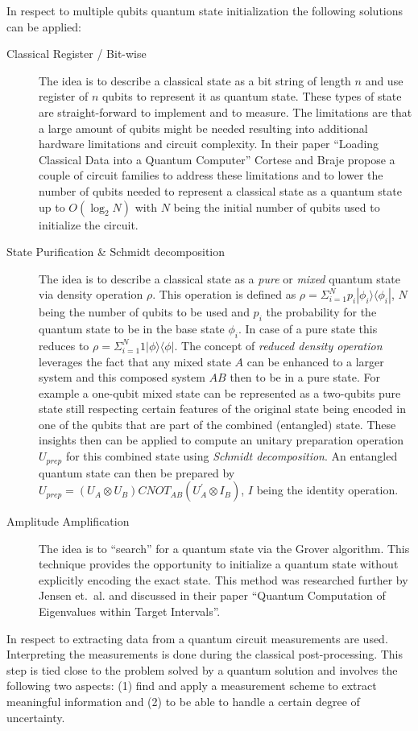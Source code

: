 In respect to multiple qubits quantum state initialization the following solutions can be applied:
\begin{description}
  \item [Classical Register / Bit-wise] The idea is to describe a classical state as a bit string of length $n$ and use register of $n$ qubits to
represent it as quantum state. These types of state are straight-forward to implement and to measure. The limitations are that a large amount of qubits might be needed resulting into additional hardware limitations and circuit complexity. In their paper \enquote{Loading Classical Data into a Quantum Computer} \cite{Corte_2018} Cortese and Braje propose a couple of circuit families to address these limitations and to lower the number of qubits needed to represent a classical state as a quantum state up to $O(\log_2{N})$ with $N$ being the initial number of qubits used to initialize the circuit.
  \item [State Purification \& Schmidt decomposition] The idea is to describe a classical state as a \emph{pure} or \emph{mixed} quantum state via density operation $\rho$. This operation is defined as $\rho = \Sigma_{i=1}^N p_i| \phi_i \rangle \langle \phi_i |$, $N$ being the number of qubits to be used and $p_i$ the probability for the quantum state to be in the base state $\phi_i$. In case of a pure state this reduces to $\rho = \Sigma_{i=1}^N 1| \phi \rangle \langle \phi |$. The concept of \emph{reduced density operation} leverages the fact that any mixed state $A$ can be enhanced to a larger system and this composed system $AB$ then to be in a pure state.\cite{Niels_2010}\cite{Lokho_2020}\cite{Qtb_Densit} For example a one-qubit mixed state can be represented as a two-qubits pure state still respecting certain features of the original state being encoded in one of the qubits that are part of the combined (entangled) state. These insights then can be applied to compute an unitary preparation operation $U_{prep}$ for this combined state using \emph{Schmidt decomposition}.\cite{Niels_2010} An entangled quantum state can then be prepared by $U_{prep} = (U_A \otimes U_B) CNOT_{AB} (U_A^{'} \otimes I_B)$, $I$ being the identity operation.\cite{Lokho_2020}
  \item [Amplitude Amplification] The idea is to \enquote{search} for a quantum state via the Grover algorithm. This technique provides the opportunity to initialize a quantum state without explicitly encoding the exact state.\cite{Daski_2015}\cite{Qtb_Grover} This method was researched further by Jensen et.~al. and discussed in their paper \enquote{Quantum Computation of Eigenvalues within Target Intervals}.\cite{Jense_2020}
\end{description}

In respect to extracting data from a quantum circuit measurements are used. Interpreting the measurements is done during the classical post-processing. This step is tied close to the problem solved by a quantum solution and involves the following two aspects: (1) find and apply a measurement scheme to extract meaningful information and (2) to be able to handle a certain degree of uncertainty.\cite{Daski_2015}\cite{Qtb_Measu}
